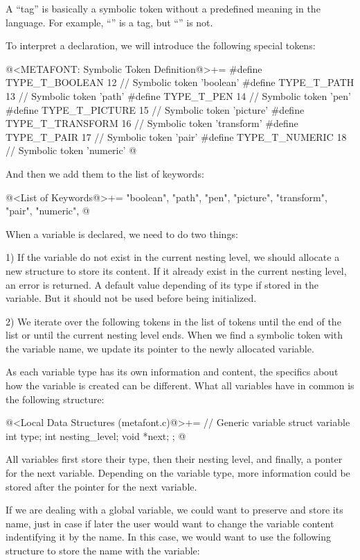 A ``tag'' is basically a symbolic token without a predefined meaning
in the language. For example, ``'' is a tag, but
``'' is not.

To interpret a declaration, we will introduce the following special
tokens:

\iniciocodigo
@<METAFONT: Symbolic Token Definition@>+=
#define TYPE_T_BOOLEAN               12 // Symbolic token 'boolean'
#define TYPE_T_PATH                  13 // Symbolic token 'path'
#define TYPE_T_PEN                   14 // Symbolic token 'pen'
#define TYPE_T_PICTURE               15 // Symbolic token 'picture'
#define TYPE_T_TRANSFORM             16 // Symbolic token 'transform'
#define TYPE_T_PAIR                  17 // Symbolic token 'pair'
#define TYPE_T_NUMERIC               18 // Symbolic token 'numeric'
@
\fimcodigo

And then we add them to the list of keywords:

\iniciocodigo
@<List of Keywords@>+=
"boolean", "path", "pen", "picture", "transform", "pair", "numeric",
@
\fimcodigo


When a variable is declared, we need to do two things:

1) If the variable do not exist in the current nesting level, we
should allocate a new structure to store its content. If it already
exist in the current nesting level, an error is returned. A default
value depending of its type if stored in the variable. But it should
not be used before being initialized.

2) We iterate over the following tokens in the list of tokens until
the end of the list or until the current nesting level ends. When we
find a symbolic token with the variable name, we update its pointer to
the newly allocated variable.


As each variable type has its own information and content, the
specifics about how the variable is created can be different. What all
variables have in common is the following structure:

\iniciocodigo
@<Local Data Structures (metafont.c)@>+=
// Generic variable
struct variable{
  int type;
  int nesting_level;
  void *next;  
};
@
\fimcodigo

All variables first store their type, then their nesting level, and
finally, a ponter for the next variable. Depending on the variable
type, more information could be stored after the pointer for the next
variable.

If we are dealing with a global variable, we could want to preserve
and store its name, just in case if later the user would want to
change the variable content indentifying it by the name. In this case,
we would want to use the following structure to store the name with
the variable:


